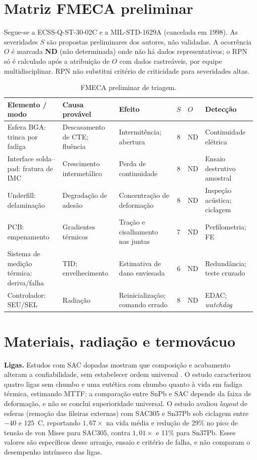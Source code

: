 \documentclass[12pt,a4paper]{article}
\begin{document}
\section{Matriz FMECA preliminar}
Segue-se a ECSS-Q-ST-30-02C \cite{ecss3002} e a MIL-STD-1629A \cite{mil1629}
(cancelada em 1998). As severidades $S$ são propostas preliminares dos autores,
não validadas. A ocorrência $O$ é marcada \textbf{ND} (não determinada) onde não
há dados representativos; o RPN só é calculado após a atribuição de $O$ com dados
rastreáveis, por equipe multidisciplinar. RPN não substitui critério de
criticidade para severidades altas.
\begin{table}[h]\centering\small
\caption{FMECA preliminar de triagem.}
\begin{tabular}{@{}p{3.1cm}p{2.6cm}p{2.6cm}cp{1.1cm}p{2.6cm}@{}}\toprule
Elemento / modo & Causa provável & Efeito & $S$ & $O$ & Detecção\\\midrule
Esfera BGA: trinca por fadiga & Descasamento de CTE; fluência & Intermitência; abertura & 8 & ND & Continuidade elétrica\\
Interface solda--pad: fratura de IMC & Crescimento intermetálico & Perda de continuidade & 8 & ND & Ensaio destrutivo amostral\\
Underfill: delaminação & Degradação de adesão & Concentração de deformação & 8 & ND & Inspeção acústica; ciclagem\\
PCB: empenamento & Gradientes térmicos & Tração e cisalhamento nas juntas & 7 & ND & Perfilometria; FE\\
Sistema de medição térmica: deriva/falha & TID; envelhecimento & Estimativa de dano enviesada & 6 & ND & Redundância; teste cruzado\\
Controlador: SEU/SEL & Radiação & Reinicialização; comando errado & 8 & ND & EDAC; \emph{watchdog}\\
\bottomrule\end{tabular}\end{table}

\section{Materiais, radiação e termovácuo}
\textbf{Ligas.} Estudos com SAC dopadas mostram que composição e acabamento
alteram a confiabilidade, sem estabelecer ordem universal
\cite{akkara2022,bae2024}. O estudo \cite{depiver2021} caracterizou quatro ligas
sem chumbo e uma eutética com chumbo quanto à vida em fadiga térmica, estimando
MTTF; a comparação entre SnPb e SAC depende da faixa de deformação, e não se
conclui superioridade universal. O estudo \cite{razzaq2025} avaliou
\emph{layout} de esferas (remoção das fileiras externas) com SAC305 e Sn37Pb sob
ciclagem entre $-40$ e $125$~\textdegree C, reportando $1{,}67\times$ na vida
média e redução de 29\% no pico de tensão de von Mises para SAC305, contra
$1{,}01\times$ e 11\% para Sn37Pb. Esses valores são específicos desse arranjo,
ensaio e critério de falha, e não comparam o desempenho intrínseco das ligas.
\end{document}
